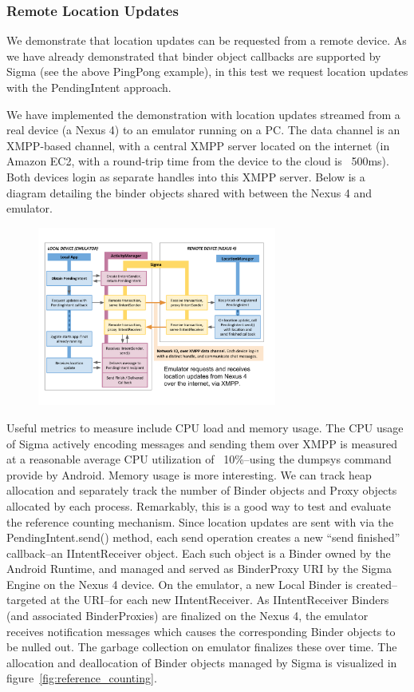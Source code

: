 \documentclass[prodmode]{acmlarge}
\begin{document}
\subsubsection{Remote Location Updates}
\label{sec:location_sharing}
We demonstrate that location updates can be requested from a remote device. As we have already demonstrated that binder object callbacks are supported by Sigma (see the above PingPong example), in this test we request location updates with the PendingIntent approach.

We have implemented the demonstration with location updates streamed from a real device (a Nexus 4) to an emulator running on a PC. The data channel is an XMPP-based channel, with a central XMPP server located on the internet (in Amazon EC2, with a round-trip time from the device to the cloud is ~500ms). Both devices login as separate handles into this XMPP server.
Below is a diagram detailing the binder objects shared with between the Nexus 4 and emulator.

\begin{figure}[h]
\centering
\includegraphics[width=0.7\textwidth]{drawings/LocationPendingIntentExample.pdf}
\end{figure}

Useful metrics to measure include CPU load and memory usage. The CPU usage of Sigma actively encoding messages and sending them over XMPP is measured at a reasonable average CPU utilization of ~10\%--using the dumpsys command provide by Android. Memory usage is more interesting. We can track heap allocation and separately track the number of Binder objects and Proxy objects allocated by each process. Remarkably, this is a good way to test and evaluate the reference counting mechanism. Since location updates are sent with via the PendingIntent.send() method, each send operation creates a new ``send finished'' callback--an IIntentReceiver object. Each such object is a Binder owned by the Android Runtime, and managed and served as BinderProxy URI by the Sigma Engine on the Nexus 4 device. On the emulator, a new Local Binder is created--targeted at the URI--for each new IIntentReceiver. As IIntentReceiver Binders (and associated BinderProxies) are finalized on the Nexus 4, the emulator receives notification messages which causes the corresponding Binder objects to be nulled out. The garbage collection on emulator finalizes these over time. The allocation and deallocation of Binder objects managed by Sigma is visualized in figure~\ref{fig:reference_counting}.
\end{document}
